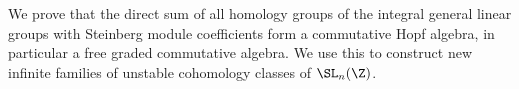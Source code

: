 We prove that the direct sum of all homology groups of the integral general linear groups with Steinberg module coefficients form a commutative Hopf algebra, in particular a free graded commutative algebra. We use this to construct new infinite families of unstable cohomology classes of $\SL_n(\Z)$.